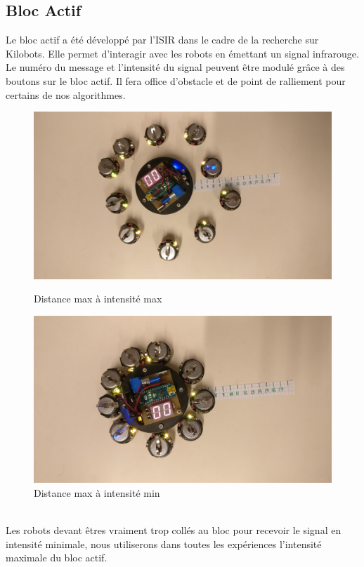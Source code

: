 \documentclass[a4paper]{article}
\begin{document}
\subsection{Bloc Actif}
Le bloc actif a été développé par l'ISIR dans le cadre de la recherche sur Kilobots. Elle permet d'interagir avec les robots en émettant un signal infrarouge. Le numéro du message et l'intensité du signal peuvent être modulé grâce à des boutons sur le bloc actif. Il fera office d'obstacle et de point de ralliement pour certains de nos algorithmes.\\
\begin{figure}[h]
	\begin{minipage}[c]{.46\linewidth}
		\centering
		\includegraphics[width=1.1\linewidth]{../../script_results/bloc_actif_max.jpg}
		\caption{Distance max à intensité max}
	\end{minipage}
	\hfill%
	\begin{minipage}[c]{.46\linewidth}
		\centering
		\includegraphics[width=1.1\linewidth]{../../script_results/bloc_actif_min.jpg}
		\caption{Distance max à intensité min}
	\end{minipage}
\end{figure}
\\
Les robots devant êtres vraiment trop collés au bloc pour recevoir le signal en intensité minimale, nous utiliserons dans toutes les expériences l'intensité maximale du bloc actif.
\end{document}
